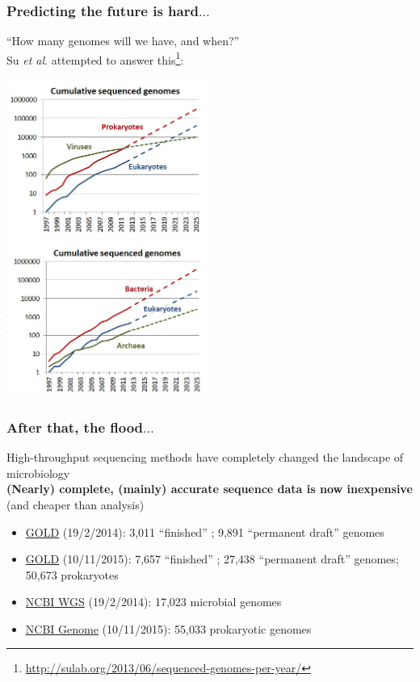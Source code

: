 \begin{frame}
  \frametitle{Predicting the future is hard$\ldots$}
    ``How many genomes will we have, and when?'' \\
    Su \textit{et al}. attempted to answer this\footnote{\tiny{\href{http://sulab.org/2013/06/sequenced-genomes-per-year/}{http://sulab.org/2013/06/sequenced-genomes-per-year/}}}:
    \begin{center}
      \includegraphics[width=0.5\textwidth]{images/cumulative_sequenced_genomes1}
      \includegraphics[width=0.5\textwidth]{images/cumulative_sequenced_genomes2}
    \end{center}     
\end{frame}

\begin{frame}
  \frametitle{After that, the flood$\ldots$}
  High-throughput sequencing methods have completely changed the landscape of microbiology \\
  \textbf{(Nearly) complete, (mainly) accurate sequence data is now inexpensive} (and cheaper than analysis)
  \begin{itemize}
    \item \href{http://www.genomesonline.org/cgi-bin/GOLD/index.cgi?page_requested=Complete+Genome+Projects&subset_requested=Complete+And+Published}{GOLD} (19/2/2014): 3,011 ``finished'' ; 9,891 ``permanent draft'' genomes
    \item \href{http://www.genomesonline.org/cgi-bin/GOLD/index.cgi?page_requested=Complete+Genome+Projects&subset_requested=Complete+And+Published}{GOLD} (10/11/2015): 7,657 ``finished'' ; 27,438 ``permanent draft'' genomes; 50,673 prokaryotes
    \item \href{http://www.ncbi.nlm.nih.gov/Traces/wgs/}{NCBI WGS} (19/2/2014): 17,023 microbial genomes
    \item \href{http://www.ncbi.nlm.nih.gov/genome/browse/}{NCBI Genome} (10/11/2015): 55,033 prokaryotic genomes
  \end{itemize}
\end{frame}

